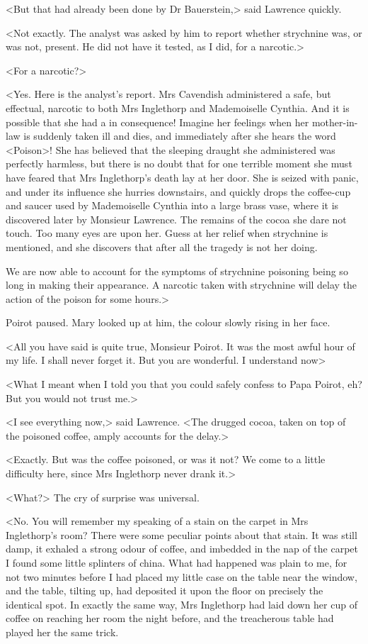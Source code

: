  <But that had already been done by Dr Bauerstein,> said Lawrence quickly. 

 <Not exactly. The analyst was asked by him to report whether strychnine was, or was not, present. He did not have it tested, as I did, for a narcotic.> 

 <For a narcotic?> 

 <Yes. Here is the analyst's report. Mrs Cavendish administered a safe, but effectual, narcotic to both Mrs Inglethorp and Mademoiselle Cynthia. And it is possible that she had a  in consequence! Imagine her feelings when her mother-in-law is suddenly taken ill and dies, and immediately after she hears the word <Poison>! She has believed that the sleeping draught she administered was perfectly harmless, but there is no doubt that for one terrible moment she must have feared that Mrs Inglethorp's death lay at her door. She is seized with panic, and under its influence she hurries downstairs, and quickly drops the coffee-cup and saucer used by Mademoiselle Cynthia into a large brass vase, where it is discovered later by Monsieur Lawrence. The remains of the cocoa she dare not touch. Too many eyes are upon her. Guess at her relief when strychnine is mentioned, and she discovers that after all the tragedy is not her doing. 

 We are now able to account for the symptoms of strychnine poisoning being so long in making their appearance. A narcotic taken with strychnine will delay the action of the poison for some hours.> 

 Poirot paused. Mary looked up at him, the colour slowly rising in her face. 

 <All you have said is quite true, Monsieur Poirot. It was the most awful hour of my life. I shall never forget it. But you are wonderful. I understand now\longdash> 

 <What I meant when I told you that you could safely confess to Papa Poirot, eh? But you would not trust me.> 

 <I see everything now,> said Lawrence. <The drugged cocoa, taken on top of the poisoned coffee, amply accounts for the delay.> 

 <Exactly. But was the coffee poisoned, or was it not? We come to a little difficulty here, since Mrs Inglethorp never drank it.> 

 <What?> The cry of surprise was universal. 

 <No. You will remember my speaking of a stain on the carpet in Mrs Inglethorp's room? There were some peculiar points about that stain. It was still damp, it exhaled a strong odour of coffee, and imbedded in the nap of the carpet I found some little splinters of china. What had happened was plain to me, for not two minutes before I had placed my little case on the table near the window, and the table, tilting up, had deposited it upon the floor on precisely the identical spot. In exactly the same way, Mrs Inglethorp had laid down her cup of coffee on reaching her room the night before, and the treacherous table had played her the same trick. 


